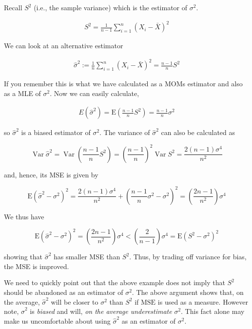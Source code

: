 \documentclass[ 11pt,%
				a4paper,%
				twoside,%
				headinclude,%
				footinclude = true,%
				cleardoublepage = empty,%
				reqno]{scrbook}
\begin{document}
\begin{example}
Recall $S^2$ (i.e., the sample variance) which is the estimator of $\sigma^{2}$. 

\begin{align*}
  S^{2}=\frac{1}{n-1} \sum_{i=1}^{n}\left(X_{i}-\bar{X}\right)^{2}
\end{align*}

We can look at an alternative estimator 

\begin{align*}
  \hat{\sigma}^{2}:=\frac{1}{n} \sum_{i=1}^{n}\left(X_{i}-\bar{X}\right)^{2}=\frac{n-1}{n} S^{2}
\end{align*}

If you remember this is what we have calculated as a MOMs estimator and also as a MLE of $\sigma^{2}$. Now we can easily calculate,

\begin{align*}
  E (\hat{\sigma}^{2})=\mathrm{E}\left(\frac{n-1}{n} S^{2}\right)=\frac{n-1}{n} \sigma^{2}
\end{align*}


so $\hat{\sigma}^{2}$ is a biased estimator of $\sigma^{2} .$ The variance of $\hat{\sigma}^{2}$ can also be calculated as

\[
\operatorname{Var} \hat{\sigma}^{2}=\operatorname{Var}\left(\frac{n-1}{n} S^{2}\right)=\left(\frac{n-1}{n}\right)^{2} \operatorname{Var} S^{2}=\frac{2(n-1) \sigma^{4}}{n^{2}}
\]

and, hence, its MSE is given by

\[
\mathrm{E}\left(\hat{\sigma}^{2}-\sigma^{2}\right)^{2}=\frac{2(n-1) \sigma^{4}}{n^{2}}+\left(\frac{n-1}{n} \sigma^{2}-\sigma^{2}\right)^{2}=\left(\frac{2 n-1}{n^{2}}\right) \sigma^{4}
\]

We thus have

\[
\mathrm{E}\left(\hat{\sigma}^{2}-\sigma^{2}\right)^{2}=\left(\frac{2 n-1}{n^{2}}\right) \sigma^{4}<\left(\frac{2}{n-1}\right) \sigma^{4}=\mathrm{E}\left(S^{2}-\sigma^{2}\right)^{2}
\]

showing that $\hat{\sigma}^{2}$ has smaller MSE than $S^{2}$. Thus, by trading off variance for bias, the MSE is improved.
\end{example}


We need to quickly point out that the above example does not imply that $S^{2}$ should be abandoned as an estimator of $\sigma^{2}$. The above argument shows that, on the average, $\hat{\sigma}^{2}$ will be closer to $\sigma^{2}$ than $S^{2}$ if $\mathrm{MSE}$ is used as a measure. However note, $\hat{\sigma}^{2}$ is \emph{biased} and will, \emph{on the average underestimate} $\sigma^{2}$. This fact alone may make us uncomfortable about using $\hat{\sigma}^{2}$ as an estimator of $\sigma^{2}$. 
\end{document}
